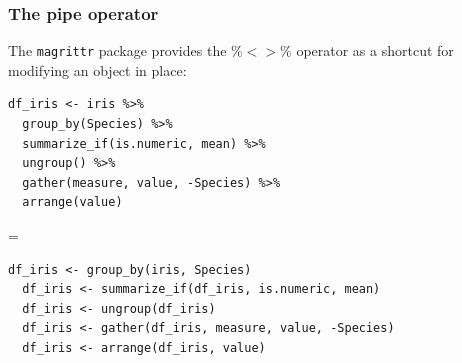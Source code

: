 \documentclass{beamer}
\begin{document}
	\begin{frame}[fragile]
		\frametitle{The pipe operator}

		The \verb|magrittr| package provides the $\%<>\%$ operator as a shortcut for modifying an object in place:

		\vspace{1em}

		\begin{exampleblock}{}
		\begin{BVerbatim}
df_iris <- iris %>%
  group_by(Species) %>%
  summarize_if(is.numeric, mean) %>%
  ungroup() %>%
  gather(measure, value, -Species) %>%
  arrange(value)
		\end{BVerbatim}
		\end{exampleblock}{}

		=

		\begin{exampleblock}{}
		\begin{BVerbatim}
df_iris <- group_by(iris, Species)
  df_iris <- summarize_if(df_iris, is.numeric, mean)
  df_iris <- ungroup(df_iris)
  df_iris <- gather(df_iris, measure, value, -Species)
  df_iris <- arrange(df_iris, value)
		\end{BVerbatim}
		\end{exampleblock}{}

	\end{frame}
\end{document}
